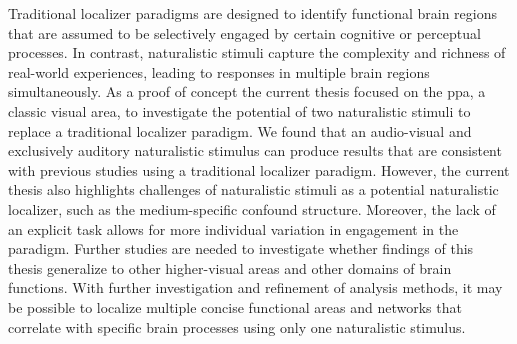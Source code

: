 %
Traditional localizer paradigms are designed to identify functional brain
regions that are assumed to be selectively engaged by certain cognitive or
perceptual processes.
%
In contrast, naturalistic stimuli capture the complexity and richness of
real-world experiences, leading to responses in multiple brain regions
simultaneously.
%
As a proof of concept the current thesis focused on the \ac{ppa}, a classic
visual area, to investigate the potential of two naturalistic stimuli to replace
a traditional localizer paradigm.
%
We found that an audio-visual and exclusively auditory naturalistic stimulus can
produce results that are consistent with previous studies using a traditional
localizer paradigm.
%
However, the current thesis also highlights challenges of naturalistic stimuli
as a potential naturalistic localizer, such as the medium-specific confound
structure.
%
Moreover, the lack of an explicit task allows for more individual variation in
engagement in the paradigm.
Further studies are needed to investigate whether findings of this thesis
generalize to other higher-visual areas and other domains of brain functions.
%
With further investigation and refinement of analysis methods, it may be
possible to localize multiple concise functional areas and networks that
correlate with specific brain processes using only one naturalistic stimulus.


